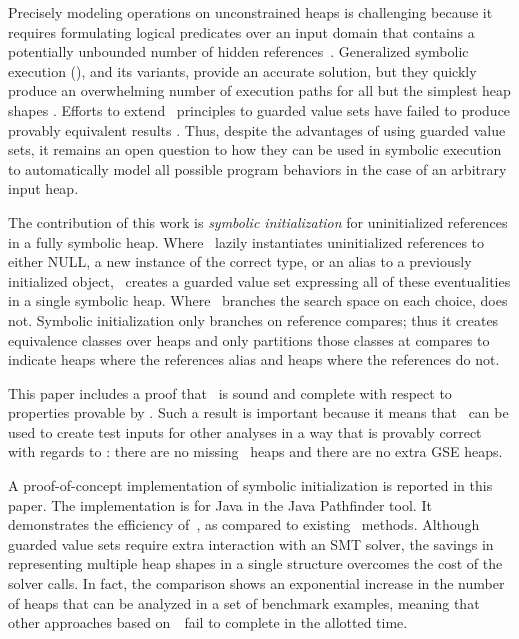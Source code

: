Precisely modeling operations on unconstrained heaps
is challenging because it requires formulating logical predicates over
an input domain that contains a potentially unbounded number of hidden
references~\cite{Chen:2013,Qu:2011}. Generalized symbolic execution
(\gsetxt{}), and its variants, provide an accurate
solution, but they quickly produce an overwhelming number of execution
paths for all but the simplest heap shapes \cite{GSE03,Deng:2007}. Efforts to
extend~\gsetxt{} principles to guarded value sets have failed to
produce provably equivalent results \cite{LISTEFFORTS}. Thus, despite
the advantages of using guarded value sets, it remains an open
question to how they can be used in symbolic execution to automatically
model all possible program behaviors in the case of an arbitrary input
heap.

The contribution of this work is \emph{symbolic initialization} for 
uninitialized references in a fully symbolic heap. Where \gsetxt\ lazily
instantiates uninitialized references to either NULL, a new instance
of the correct type, or an alias to a previously initialized object, \symtxt\ creates a guarded value set
expressing all of these eventualities in a single symbolic heap. Where
\gsetxt\ branches the search space on each choice, \symtxt{} does not. Symbolic initialization only branches on reference compares; thus it creates equivalence classes over heaps and only partitions those classes at compares to indicate heaps where the references
alias and heaps where the references do not.

This paper includes a proof that \symtxt\ is sound and
complete with respect to properties provable by \gsetxt. Such a result is
important because it means that \symtxt\ can be used to
create test inputs for other analyses in a way that is provably
correct with regards to \gsetxt: there are no missing \gsetxt\ heaps and there are
no extra GSE heaps.

A proof-of-concept implementation of symbolic initialization is
reported in this paper. The implementation is for Java in the Java
Pathfinder tool. It demonstrates the efficiency of~\symtxt{}, as
compared to existing~\gsetxt{} methods. Although guarded value
sets require extra interaction with an SMT solver, the
savings in representing multiple heap shapes in a single
structure overcomes the cost of the solver calls. In fact, the
comparison shows an exponential increase in the number of heaps that
can be analyzed in a set of benchmark examples, meaning that other
approaches based on~\gsetxt\ fail to complete in the allotted time.

